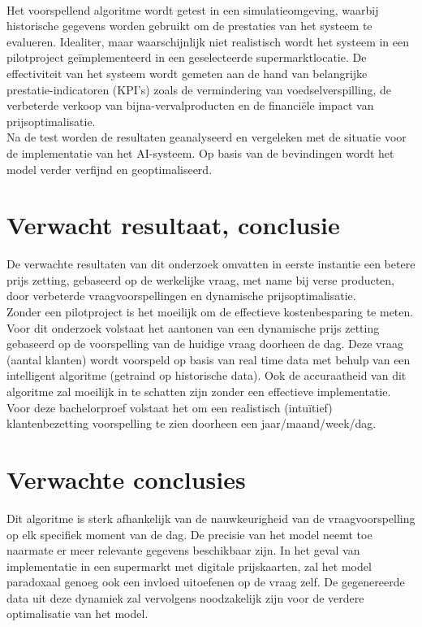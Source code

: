 \\
Het voorspellend algoritme wordt getest in een simulatieomgeving,
waarbij historische gegevens worden gebruikt om de prestaties van het systeem te evalueren.
Idealiter, maar waarschijnlijk niet realistisch wordt het systeem in een pilotproject geïmplementeerd in een geselecteerde supermarktlocatie.
De effectiviteit van het systeem wordt gemeten aan de hand van belangrijke prestatie-indicatoren (KPI's) zoals de vermindering van voedselverspilling,
de verbeterde verkoop van bijna-vervalproducten en de financiële impact van prijsoptimalisatie.
\\
Na de test worden de resultaten geanalyseerd en vergeleken met de situatie voor de implementatie van het AI-systeem.
Op basis van de bevindingen wordt het model verder verfijnd en geoptimaliseerd.


\section{Verwacht resultaat, conclusie}%
\label{sec:verwachte_resultaten}
De verwachte resultaten van dit onderzoek omvatten in eerste instantie een betere prijs zetting, gebaseerd op de werkelijke vraag,
met name bij verse producten, door verbeterde vraagvoorspellingen en dynamische prijsoptimalisatie.
\\
Zonder een pilotproject is het moeilijk om de effectieve kostenbesparing te meten.
Voor dit onderzoek volstaat het aantonen van een dynamische prijs zetting gebaseerd op de voorspelling van de huidige vraag doorheen de dag.
Deze vraag (aantal klanten) wordt voorspeld op basis van real time data met behulp van een intelligent algoritme (getraind op historische data).
Ook de accuraatheid van dit algoritme zal moeilijk in te schatten zijn zonder een effectieve implementatie.
Voor deze bachelorproef volstaat het om een realistisch (intuïtief) klantenbezetting voorspelling te zien doorheen een jaar/maand/week/dag.

\section{Verwachte conclusies}
\label{sec:verwachte_conclusies}

Dit algoritme is sterk afhankelijk van de nauwkeurigheid van de vraagvoorspelling op elk specifiek moment van de dag.
De precisie van het model neemt toe naarmate er meer relevante gegevens beschikbaar zijn.
In het geval van implementatie in een supermarkt met digitale prijskaarten, zal het model paradoxaal genoeg ook een invloed uitoefenen op de vraag zelf.
De gegenereerde data uit deze dynamiek zal vervolgens noodzakelijk zijn voor de verdere optimalisatie van het model.